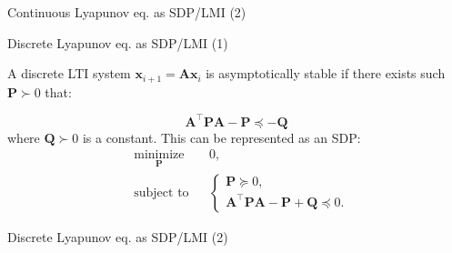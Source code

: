 \documentclass{beamer}
\begin{document}
\begin{frame}{Continuous Lyapunov eq. as SDP/LMI (2)}
	\begin{flushleft}
		
		
		
	\end{flushleft}
\end{frame}




\begin{frame}{Discrete Lyapunov eq. as SDP/LMI (1)}
	\begin{flushleft}
		
		A discrete LTI system $\mathbf{x}_{i+1} = \mathbf{A}\mathbf{x}_i$ is asymptotically stable if there exists such $\mathbf{P} \succ 0$ that: 
		
		\begin{equation}
			\mathbf{A}^\top \mathbf{P}\mathbf{A} - \mathbf{P}  \preceq - \mathbf{Q}
		\end{equation}
		where $\mathbf{Q} \succ 0$ is a constant. This can be represented as an SDP:
		\begin{equation}
			\begin{aligned}
				& \underset{\mathbf{P}}{\text{minimize}}
				& & 0, \\
				& \text{subject to}
				& & \begin{cases}
					\mathbf{P} \succeq 0, \\
					\mathbf{A}^\top \mathbf{P}\mathbf{A} - \mathbf{P} + \mathbf{Q} \preceq 0.
				\end{cases}
			\end{aligned}
		\end{equation}
		
		
	\end{flushleft}
\end{frame}



\begin{frame}{Discrete Lyapunov eq. as SDP/LMI (2)}
	\begin{flushleft}
		
		
		
	\end{flushleft}
\end{frame}
\end{document}
